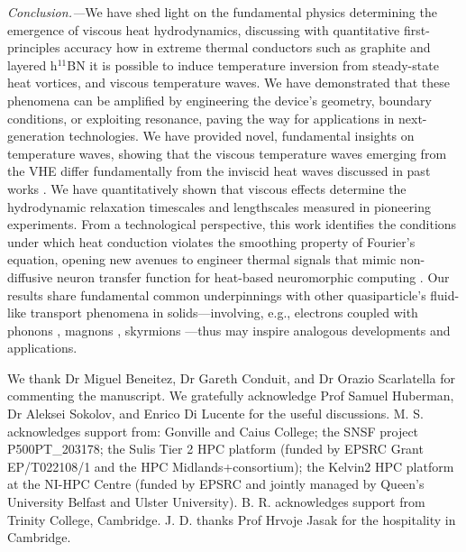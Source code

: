 \documentclass[
prb,
twocolumn,
superscriptaddress,
 amsmath,amssymb,
 aps,
longbibliography,
]{revtex4-2}
\begin{document}
\textit{Conclusion.---}We have shed light on the fundamental physics determining the emergence of viscous heat hydrodynamics, discussing
with quantitative first-principles accuracy how in extreme thermal conductors such as graphite and layered h$^{11}$BN it is possible to induce temperature inversion from steady-state heat vortices, and viscous temperature waves.
We have demonstrated that these phenomena can be amplified by engineering the device’s geometry, boundary conditions,
or exploiting resonance, paving the way for applications in next-generation technologies.
We have provided novel, fundamental insights on temperature waves, showing that the viscous temperature waves emerging from the VHE differ fundamentally from the inviscid heat waves discussed in past works \cite{joseph_heat_1989,tzou_unified_1995,barletta_hyperbolic_1996,xu_thermal_2002,xu_thermal_2021}. We have quantitatively shown that viscous effects determine the hydrodynamic relaxation timescales \cite{Jeong2021} and lengthscales \cite{Huberman2019,Ding2022} measured in pioneering experiments.
From a technological perspective, this work identifies the conditions under which heat conduction violates the smoothing property of Fourier's equation, opening new avenues to engineer thermal signals that mimic non-diffusive neuron transfer function for heat-based neuromorphic computing \cite{nataf_using_2024,torres_thermal_2023}.
Our results share fundamental common underpinnings with other quasiparticle’s fluid-like transport phenomena in solids---involving, e.g., electrons \cite{e-vortexes,palm_observation_2024} coupled with phonons \cite{coulter_microscopic_2018,vool_imaging_2021,yang_evidence_2021,jaoui_formation_2022,huang_electron-phonon_2021,protik_elphbolt_2022,levchenko_transport_2020,coulterCoupledElectronphononHydrodynamics2025a}, magnons \cite{wei_giant_2022}, skyrmions \cite{PhysRevLett.130.106703}---thus may inspire analogous developments and applications.


\begin{acknowledgements}

We thank Dr Miguel Beneitez, Dr Gareth Conduit, and Dr Orazio Scarlatella for commenting the manuscript.
We gratefully acknowledge Prof Samuel Huberman, Dr Aleksei Sokolov, and Enrico Di Lucente for the useful discussions.
M. S. acknowledges support from: Gonville and Caius College; the SNSF project P500PT\_203178; the Sulis Tier 2 HPC platform (funded by EPSRC Grant EP/T022108/1 and the HPC Midlands+consortium); the Kelvin2 HPC platform at the NI-HPC Centre (funded by EPSRC and jointly managed by Queen's University Belfast and Ulster University).
B. R. acknowledges support from Trinity College, Cambridge.
J. D. thanks Prof Hrvoje Jasak for the hospitality in Cambridge.
\end{acknowledgements}
\end{document}
